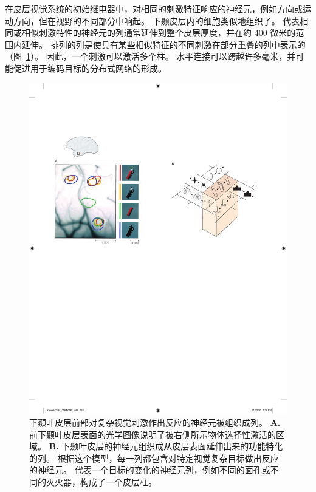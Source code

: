 在皮层视觉系统的初始继电器中，对相同的刺激特征响应的神经元，例如方向或运动方向，但在视野的不同部分中响起。
下颞皮层内的细胞类似地组织了。
代表相同或相似刺激特性的神经元的列通常延伸到整个皮层厚度，并在约 400 微米的范围内延伸。
排列的列是使具有某些相似特征的不同刺激在部分重叠的列中表示的（图~\ref{fig:24_5}）。
因此，一个刺激可以激活多个柱。
水平连接可以跨越许多毫米，并可能促进用于编码目标的分布式网络的形成。


\begin{figure}[htbp]
	\centering
	\includegraphics[width=1.0\linewidth]{chap24/fig_24_5}
	\caption{下颞叶皮层前部对复杂视觉刺激作出反应的神经元被组织成列。
		\textbf{A.} 前下颞叶皮层表面的光学图像说明了被右侧所示物体选择性激活的区域。
		\textbf{B.} 下颞叶皮层的神经元组织成从皮层表面延伸出来的功能特化的列。
		根据这个模型，每一列都包含对特定视觉复杂目标做出反应的神经元。
		代表一个目标的变化的神经元列，例如不同的面孔或不同的灭火器，构成了一个皮层柱。}
	\label{fig:24_5}
\end{figure}



